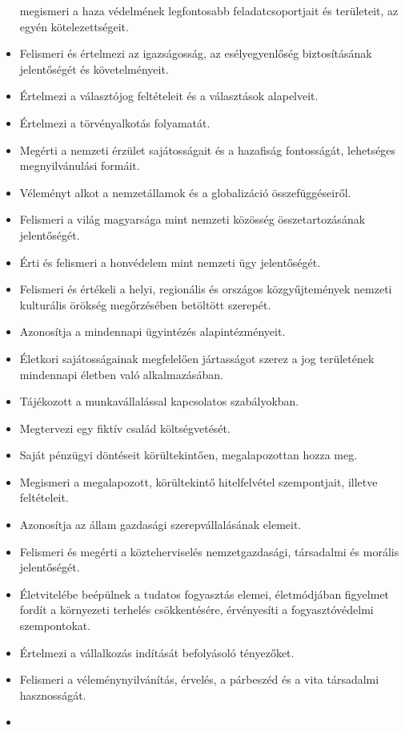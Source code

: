 \begin{itemize}
  megismeri a haza védelmének legfontosabb feladatcsoportjait és
  területeit, az egyén kötelezettségeit.
\item
  Felismeri és értelmezi az igazságosság, az esélyegyenlőség
  biztosításának jelentőségét és követelményeit.
\item
  Értelmezi a választójog feltételeit és a választások alapelveit.
\item
  Értelmezi a törvényalkotás folyamatát.
\item
  Megérti a nemzeti érzület sajátosságait és a hazafiság fontosságát,
  lehetséges megnyilvánulási formáit.
\item
  Véleményt alkot a nemzetállamok és a globalizáció összefüggéseiről.
\item
  Felismeri a világ magyarsága mint nemzeti közösség összetartozásának
  jelentőségét.
\item
  Érti és felismeri a honvédelem mint nemzeti ügy jelentőségét.
\item
  Felismeri és értékeli a helyi, regionális és országos közgyűjtemények
  nemzeti kulturális örökség megőrzésében betöltött szerepét.
\item
  Azonosítja a mindennapi ügyintézés alapintézményeit.
\item
  Életkori sajátosságainak megfelelően jártasságot szerez a jog
  területének mindennapi életben való alkalmazásában.
\item
  Tájékozott a munkavállalással kapcsolatos szabályokban.
\item
  Megtervezi egy fiktív család költségvetését.
\item
  Saját pénzügyi döntéseit körültekintően, megalapozottan hozza meg.
\item
  Megismeri a megalapozott, körültekintő hitelfelvétel szempontjait,
  illetve feltételeit.
\item
  Azonosítja az állam gazdasági szerepvállalásának elemeit.
\item
  Felismeri és megérti a közteherviselés nemzetgazdasági, társadalmi és
  morális jelentőségét.
\item
  Életvitelébe beépülnek a tudatos fogyasztás elemei, életmódjában
  figyelmet fordít a környezeti terhelés csökkentésére, érvényesíti a
  fogyasztóvédelmi szempontokat.
\item
  Értelmezi a vállalkozás indítását befolyásoló tényezőket.
\item
  Felismeri a véleménynyilvánítás, érvelés, a párbeszéd és a vita
  társadalmi hasznosságát.
\item

\end{itemize}

